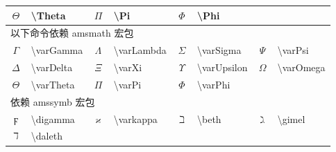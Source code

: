 \documentclass[a4paper]{ctexart}
\begin{document}
\begin{table}[H]
\begin{tabular}{clclclcl}
            $\Theta$        & \textbackslash Theta      & $\Pi$         & \textbackslash Pi         & 
            $\Phi$          & \textbackslash Phi                                                    \\
            \midrule
            \multicolumn{4}{l}{以下命令依赖 amsmath 宏包}\\
            $\varGamma$     & \textbackslash varGamma   & $\varLambda$  & \textbackslash varLambda  & 
            $\varSigma$     & \textbackslash varSigma   & $\varPsi$     & \textbackslash varPsi     \\
            $\varDelta$     & \textbackslash varDelta   & $\varXi$      & \textbackslash varXi      &
            $\varUpsilon$   & \textbackslash varUpsilon & $\varOmega$   & \textbackslash varOmega   \\
            $\varTheta$     & \textbackslash varTheta   & $\varPi$      & \textbackslash varPi      &
            $\varPhi$       & \textbackslash varPhi                                                 \\
            \midrule
            \multicolumn{4}{l}{依赖 amssymb 宏包}\\
            $\digamma$      & \textbackslash digamma    & $\varkappa$   & \textbackslash varkappa   &
            $\beth$         & \textbackslash beth       & $\gimel$‬      & \textbackslash gimel      \\ 
            $\daleth$       & \textbackslash daleth                                                 \\
            \bottomrule
        \end{tabular}        
    \end{table}
\end{document}
